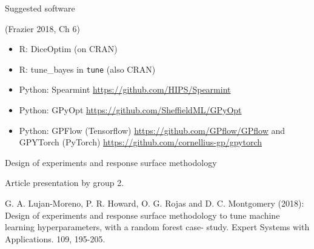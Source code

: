 \documentclass[
  ignorenonframetext,
]{beamer}
\begin{document}
\begin{frame}[fragile]

\begin{block}{Suggested software}

(Frazier 2018, Ch 6)

\begin{itemize}
\item
  R: DiceOptim (on CRAN)
\item
  R: tune\_bayes in \texttt{tune} (also CRAN)
\item
  Python: Spearmint \url{https://github.com/HIPS/Spearmint}
\item
  Python: GPyOpt \url{https://github.com/SheffieldML/GPyOpt}
\item
  Python: GPFlow (Tensorflow) \url{https://github.com/GPflow/GPflow} and
  GPYTorch (PyTorch) \url{https://github.com/cornellius-gp/gpytorch}
\end{itemize}

\end{block}

\end{frame}

\begin{frame}

\begin{block}{Design of experiments and response surface methodology}

Article presentation by group 2.

G. A. Lujan-Moreno, P. R. Howard, O. G. Rojas and D. C. Montgomery
(2018): Design of experiments and response surface methodology to tune
machine learning hyperparameters, with a random forest case- study.
Expert Systems with Applications. 109, 195-205.

\end{block}

\end{frame}
\end{document}
